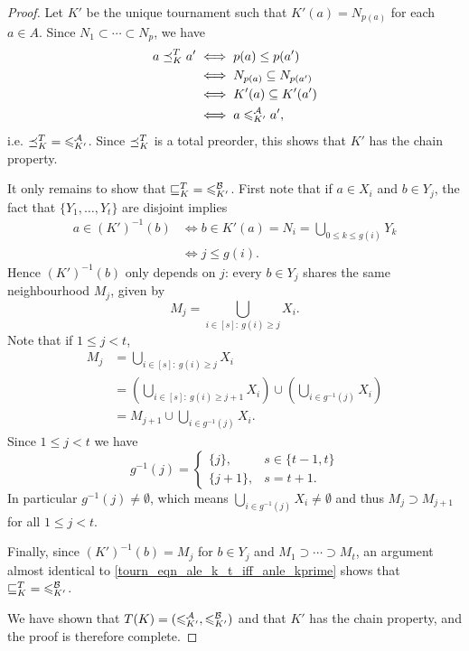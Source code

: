 \begin{proof}
    Let $K'$ be the unique tournament such that $K'(a) = N_{p(a)}$ for each $a
    \in A$. Since $N_1 \subset \cdots \subset N_p$, we have
    \begin{equation}
        \label{tourn_eqn_ale_k_t_iff_anle_kprime}
        \begin{aligned}
            a \preceq_K^T a'
            &\iff p(a) \le p(a') \\
            &\iff N_{p(a)} \subseteq N_{p(a')} \\
            &\iff K'(a) \subseteq K'(a') \\
            &\iff a \leqslant^{\mathcal{A}}_{K'} a',
        \end{aligned}
    \end{equation}
    i.e. ${\preceq_K^T} = {\leqslant^{\mathcal{A}}_{K'}}$. Since ${\preceq_K^T}$ is a total
    preorder, this shows that $K'$ has the chain property.

    It only remains to show that ${\sqsubseteq_K^T} = {\leqslant^{\mathcal{B}}_{K'}}$. First note
    that if $a \in X_i$ and $b \in Y_j$, the fact that $\{Y_1,\ldots,Y_t\}$ are
    disjoint implies
    \begin{align*}
        a \in (K')^{-1}(b)
        &\iff b \in K'(a) = N_i = \bigcup_{0 \le k \le g(i)}{Y_k} \\
        &\iff j \le g(i).
    \end{align*}
    Hence $(K')^{-1}(b)$ only depends on $j$: every $b \in Y_j$ shares the same
    neighbourhood $M_j$, given by
    \[
        M_j = \bigcup_{i \in [s] :\ g(i) \ge j}{X_i}.
    \]
    Note that if $1 \le j < t$,
    \begin{align*}
        M_j
        &= \bigcup_{i \in [s] :\ g(i) \ge j}{X_i} \\
        &= \left(\bigcup_{i \in [s] :\ g(i) \ge j + 1}{X_i}\right)
            \cup
            \left(\bigcup_{i \in g^{-1}(j)}{X_i}\right) \\
        &= M_{j+1} \cup \bigcup_{i \in g^{-1}(j)}{X_i}.
    \end{align*}
    Since $1 \le j < t$ we have
    \[
        g^{-1}(j) = \begin{cases}
            \{j\},& s \in \{t-1,t\} \\
            \{j+1\},& s = t + 1.
        \end{cases}
    \]
    In particular $g^{-1}(j) \ne \emptyset$, which means $\bigcup_{i \in
    g^{-1}(j)}{X_i} \ne \emptyset$ and thus $M_j \supset M_{j+1}$
    for all $1 \le j < t$.

    Finally, since $(K')^{-1}(b) = M_j$ for $b \in Y_j$ and $M_1 \supset \cdots
    \supset M_t$, an argument almost identical to
    \cref{tourn_eqn_ale_k_t_iff_anle_kprime} shows that ${\sqsubseteq_K^T} =
    {\leqslant^{\mathcal{B}}_{K'}}$.

    We have shown that $T(K) = ({\leqslant^{\mathcal{A}}_{K'}}, {\leqslant^{\mathcal{B}}_{K'}})$ and that $K'$
    has the chain property, and the proof is therefore complete.
\end{proof}

